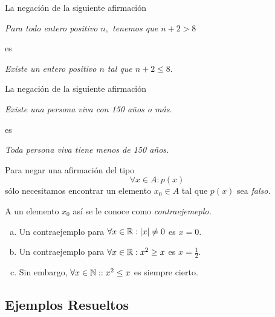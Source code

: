  \begin{exmp}
  \label{lip:exmp:4.10.a}
  La negaci\'on de la siguiente afirmaci\'on
  \begin{center}
   \emph{Para todo entero positivo $n,$ tenemos que $n+2>8$}
  \end{center}
es 
\begin{center}
 \emph{Existe un entero positivo $n$ tal que $n+2 \leq 8.$}
\end{center}

 \end{exmp}




 \begin{exmp}
  \label{lip:exmp:4.10.b}
  La negaci\'on de la siguiente afirmaci\'on
  \begin{center}
   \emph{Existe una persona viva con 150 a\~nos o m\'as.}
  \end{center}
 es 
 \begin{center}
  \emph{Toda persona viva tiene menos de 150 a\~nos.}
 \end{center}

 \end{exmp}




 \begin{rem}
  Para negar una afirmaci\'on del tipo $$\forall x \in A: p(x)$$ s\'olo necesitamos encontrar un elemento $x_{0}\in A$ tal que $p(x)$ sea \emph{falso.}
  
  
  A un elemento $x_{0}$ as\'i se le conoce como \emph{contraejemeplo.}
 \end{rem}




 \begin{exmp}
 \label{lip:4.11}
  \begin{enumerate}[(a)]
   \item 
  Un contraejemplo para $\forall x \in \mathbb{R}: \left|x\right|\neq 0$ es $x=0.$  
   \item 
  Un contraejemplo para $\forall x \in \mathbb{R}: x^{2}\geq x$ es $x=\frac{1}{2}.$  
   \item 
  Sin embargo, $\forall x \in \mathbb{N}: : x^{2}\leq x$ es siempre cierto.
  \end{enumerate}

 \end{exmp}



\subsection{Ejemplos Resueltos}

